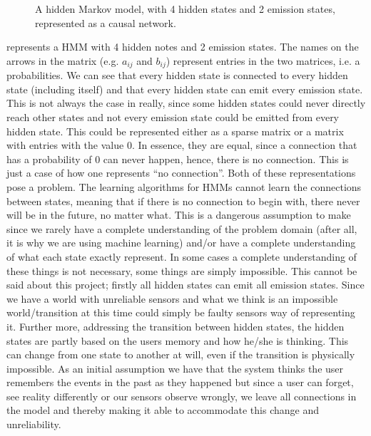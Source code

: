 \begin{figure}[htbp]
\caption[A hidden Markov model represented as a causal network.]{A hidden Markov model, with 4 hidden states and 2 emission states, represented as a causal network.}\label{fig:HMMCausalNet}
\end{figure}

 represents a HMM with 4 hidden notes and 2 emission states. The names on the arrows in the matrix (e.g. $a_{ij}$ and $b_{ij}$) represent entries in the two matrices, i.e. a probabilities. We can see that every hidden state is connected to every hidden state (including itself) and that every hidden state can emit every emission state. This is not always the case in really, since some hidden states could never directly reach other states and not every emission state could be emitted from every hidden state. This could be represented either as a sparse matrix or a matrix with entries with the value 0. In essence, they are equal, since a connection that has a probability of 0 can never happen, hence, there is no connection. This is just a case of how one represents \enquote{no connection}. Both of these representations pose a problem. The learning algorithms for HMMs cannot learn the connections between states, meaning that if there is no connection to begin with, there never will be in the future, no matter what. This is a dangerous assumption to make since we rarely have a complete understanding of the problem domain (after all, it is why we are using machine learning) and/or have a complete understanding of what each state exactly represent. In some cases a complete understanding of these things is not necessary, some things are simply impossible. This cannot be said about this project; firstly all hidden states can emit all emission states. Since we have a world with unreliable sensors and what we think is an impossible world/transition at this time could simply be faulty sensors way of representing it. Further more, addressing the transition between hidden states, the hidden states are partly based on the users memory and how he/she is thinking. This can change from one state to another at will, even if the transition is physically impossible. As an initial assumption we have that the system thinks the user remembers the events in the past as they happened but since a user can forget, see reality differently or our sensors observe wrongly, we leave all connections in the model and thereby making it able to accommodate this change and unreliability.

